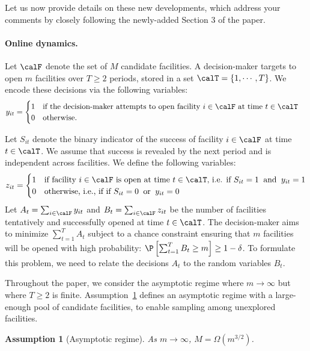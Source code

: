 \documentclass[11pt]{article}
\newtheorem{assumption}{Assumption}[]
\begin{document}
Let us now provide details on these new developments, which address your comments by closely following the newly-added Section 3 of the paper.

\paragraph{Online dynamics.}
Let $\calF$ denote the set of $M$ candidate facilities. A decision-maker targets to open $m$ facilities over $T\geq 2$ periods, stored in a set $\calT=\{1,\cdots,T\}$. We encode these decisions via the following variables:
\begin{align*}
    y_{it}&=\begin{cases}
        1&\text{if the decision-maker attempts to open facility $i\in\calF$ at time $t\in\calT$}\\
        0&\text{otherwise.}
    \end{cases}
\end{align*}

Let $S_{it}$ denote the binary indicator of the success of facility $i\in\calF$ at time $t\in\calT$. We assume that success is revealed by the next period and is independent across facilities. We define the following variables:
\begin{equation}\label{eq:z_R1}
    z_{it} = \begin{cases}
        1 & \text{if facility $i\in\calF$ is open at time $t\in\calT$, i.e. if}\ S_{it} = 1 \;\; \text{and}\;\; y_{it}=1\\ 
        0 & \text{otherwise, i.e., if}\ \text{if}\ S_{it} = 0 \;\; \text{or}\;\; y_{it}=0
    \end{cases}
\end{equation}
Let $A_t=\sum_{i\in\calF}y_{it}$ and $B_t=\sum_{i\in\calF}z_{it}$ be the number of facilities tentatively and successfully opened at time $t\in\calT$. The decision-maker aims to minimize $\sum_{t=1}^T A_t$ subject to a chance constraint ensuring that $m$ facilities will be opened with high probability: $\P\left[\sum_{t=1}^TB_t\geq m\right]\geq1-\delta$. To formulate this problem, we need to relate the decisions $A_t$ to the random variables $B_t$.

Throughout the paper, we consider the asymptotic regime where $m\to\infty$ but where $T\geq2$ is finite. Assumption~\ref{ass:regime_R1} defines an asymptotic regime with a large-enough pool of candidate facilities, to enable sampling among unexplored facilities.
\setcounter{assumption}{0}
\begin{assumption}[Asymptotic regime]
    \label{ass:regime_R1}
   As $m \to \infty$, $M=\Omega(m^{3/2})$.
\end{assumption}
\end{document}
